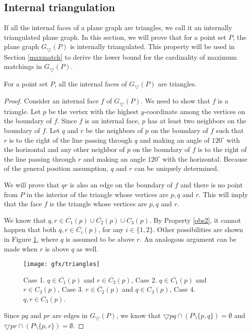 \subsection{Internal triangulation}
If all the internal faces of a plane graph are triangles, we call it an internally triangulated plane graph. In this section, we will prove that for 
a point set $P$, the plane graph $G_\bigtriangledown(P)$ is internally triangulated. This property will be  used in Section \ref{maxmatch} to derive 
the lower bound for the cardinality of maximum matchings in $G_\bigtriangledown(P)$.
\begin{lemma}\label{internal}
 For a point set $P$, all the internal faces of $G_\bigtriangledown(P)$ are triangles.
\end{lemma}
\begin{proof}
Consider an internal face $f$ of $G_\bigtriangledown(P)$. We need to show that $f$ is a triangle. Let $p$ be the vertex with the highest $y$-coordinate 
among the vertices on the boundary of $f$. Since $f$ is an internal face, $p$ has at least two neighbors on the boundary of $f$. Let $q$ and $r$ be 
the neighbors of $p$ on the boundary of $f$ such that $r$ is to the right of the line passing through $q$ and making an angle of $120^{\circ}$ with 
the horizontal and any other neighbor of $p$ on the boundary of $f$ is to the right of the line passing through $r$ and making an angle $120^{\circ}$ 
with the horizontal. Because of the general position assumption, $q$ and $r$ can be uniquely determined. 

We will prove that $qr$ is also an edge on the boundary of $f$ and there is no point from $P$ in the interior of the triangle whose vertices are $p, q$ 
and $r$. This will imply that the face $f$ is the triangle whose vertices are $p, q$ and $r$. 

We know that $q, r \in \overline{C_1}(p) \cup \overline{C_2}(p) \cup C_3(p)$. By Property \ref{obs2},
it cannot happen that both $q, r \in \overline{C_i}(p)$, for any $ i \in \{1, 2\}$.
Other possibilities are shown in Figure \ref{figtriangles}, where $q$ is assumed to be above $r$.
An analogous argument can be made when $r$ is above $q$ as well.
\begin{figure}
\centering
  \texttt{[image: gfx/triangles]}   %
  \caption{Case 1. $q \in \overline{C_1}(p)$ and $r \in \overline{C_2}(p)$, Case 2. $q \in \overline{C_1}(p)$ and $r \in C_3(p)$, 
Case 3. $r \in \overline{C_2}(p)$ and $q \in C_3(p)$, Case 4. $q, r \in C_3(p)$.}
\label{figtriangles}
  \end{figure}
Since $pq$ and $pr$ are edges in $G_\bigtriangledown(P)$, we know that $\bigtriangledown pq \cap (P \setminus \{p, q\}) =\emptyset$ 
and
$\bigtriangledown pr \cap (P \setminus \{p, r\})=\emptyset$. 


\end{proof}

